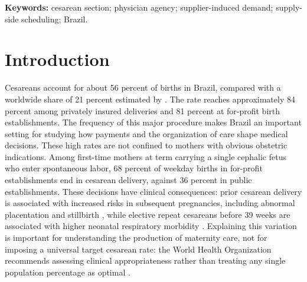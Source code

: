 \documentclass[12pt]{article}
\begin{document}
\begin{sloppypar}
\noindent \textbf{Keywords:} cesarean section; physician agency; supplier-induced
demand; supply-side scheduling; Brazil.
\end{sloppypar}

\newpage

\section{Introduction}\label{sec:intro}

Cesareans account for about 56 percent of births in Brazil, compared with a worldwide share of 21 percent estimated by
\citet{betran2021}. The rate reaches approximately 84 percent among privately insured deliveries and 81 percent at for-profit birth establishments. The frequency of this major procedure makes Brazil an important setting for studying how payments and the organization of care shape medical decisions. These high rates are not confined to mothers with obvious obstetric indications. Among first-time mothers at term carrying a single cephalic fetus who enter spontaneous labor, 68 percent of weekday births in for-profit establishments end in cesarean delivery, against 36 percent in public establishments. These decisions have clinical consequences: prior cesarean delivery is associated with increased risks in subsequent pregnancies, including abnormal placentation and stillbirth \citep{sandall2018}, while elective repeat cesareans before 39 weeks are associated with higher neonatal respiratory morbidity \citep{tita2009}. Explaining this variation is important for understanding the production of maternity care, not for imposing a universal target cesarean rate: the World Health Organization recommends assessing clinical appropriateness rather than treating any single population percentage as optimal \citep{who2015cesarean}.
\end{document}
